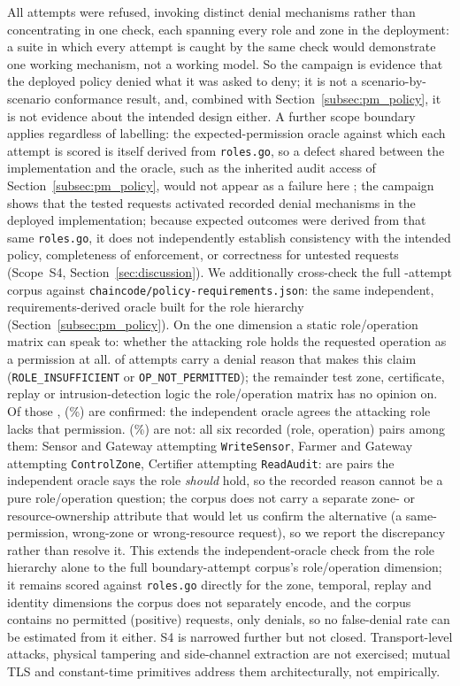 \documentclass[a4paper,fleqn]{cas-dc}
\begin{document}
All \SecAttempts{} attempts were refused, invoking \SecDistinctReasons{}
distinct denial mechanisms rather than concentrating in one check, each
spanning every role and zone in the deployment: a suite in which every
attempt is caught by the same check would demonstrate one working
mechanism, not a working model. So the campaign is evidence that the
deployed policy denied what it was asked to deny; it is not a
scenario-by-scenario conformance result, and, combined with
Section~\ref{subsec:pm_policy}, it is not evidence about the intended
design either. A further scope boundary applies regardless of labelling: the
expected-permission oracle against which each attempt is scored is itself
derived from \texttt{roles.go}, so a defect shared between the
implementation and the oracle, such as the inherited audit access of
Section~\ref{subsec:pm_policy}, would not appear as a failure here ; the
campaign shows that the tested requests activated \SecDistinctReasons{}
recorded denial mechanisms in the deployed implementation; because
expected outcomes were derived from that same \texttt{roles.go}, it does
not independently establish consistency with the intended policy,
completeness of enforcement, or correctness for untested requests
(Scope~S4, Section~\ref{sec:discussion}). We additionally cross-check
the full \SecAttempts{}-attempt corpus against
\texttt{chaincode/policy-requirements.json}: the same independent,
requirements-derived oracle built for the role hierarchy
(Section~\ref{subsec:pm_policy}). On the one dimension a static
role/operation matrix can speak to: whether the attacking role holds the
requested operation as a permission at all. \SecOracleInScope{} of
\SecAttempts{} attempts carry a denial reason that makes this claim
(\texttt{ROLE\_INSUFFICIENT} or \texttt{OP\_NOT\_PERMITTED}); the
remainder test zone, certificate, replay or intrusion-detection logic the
role/operation matrix has no opinion on. Of those \SecOracleInScope{},
\SecOracleConsistent{} (\SecOracleConsistentPct\%) are confirmed: the
independent oracle agrees the attacking role lacks that permission.
\SecOracleDiscrepant{} (\SecOracleDiscrepantPct\%) are not: all six
recorded (role, operation) pairs among them: Sensor and Gateway
attempting \texttt{WriteSensor}, Farmer and Gateway attempting
\texttt{ControlZone}, Certifier attempting \texttt{ReadAudit}: are
pairs the independent oracle says the role \emph{should} hold, so the
recorded reason cannot be a pure role/operation question; the corpus does
not carry a separate zone- or resource-ownership attribute that would let
us confirm the alternative (a same-permission, wrong-zone or
wrong-resource request), so we report the discrepancy rather than resolve
it. This extends the independent-oracle check from the role hierarchy
alone to the full boundary-attempt corpus's role/operation dimension; it
remains scored against \texttt{roles.go} directly for the zone, temporal,
replay and identity dimensions the corpus does not separately encode, and
the corpus contains no permitted (positive) requests, only denials, so no
false-denial rate can be estimated from it either. S4 is narrowed
further but not closed. Transport-level attacks,
physical tampering and side-channel extraction are not exercised; mutual
TLS and constant-time primitives address them architecturally, not
empirically.
\end{document}
